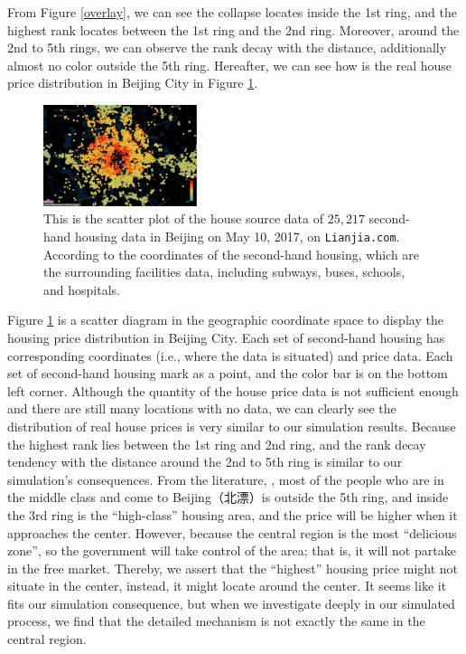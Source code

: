 \documentclass[10pt]{article}
\begin{document}
\begin{multicols}{2}
        From Figure \ref{overlay}, we can see the collapse locates inside the 1st ring, and the highest rank locates between the 1st ring and the 2nd ring. Moreover, around the 2nd to 5th rings, we can observe the rank decay with the distance, additionally almost no color outside the 5th ring. Hereafter, we can see how is the real house price distribution in Beijing City in Figure \ref{houseprice}.
        
    \begin{figure}[H]
        \centering 
        \includegraphics[width = 0.4\textwidth]{houseprice.PNG}
        \caption{This is the scatter plot of the house source data of $25,217$ second-hand housing data in Beijing on May 10, 2017, on \texttt{Lianjia.com}. According to the coordinates of the second-hand housing, which are the surrounding facilities data, including subways, buses, schools, and hospitals. \cite{price_git}}
        \label{houseprice}
    \end{figure}
    
        Figure \ref{houseprice} is a scatter diagram in the geographic coordinate space to display the housing price distribution in Beijing City. Each set of second-hand housing has corresponding coordinates (i.e., where the data is situated) and price data. Each set of second-hand housing mark as a point, and the color bar is on the bottom left corner. Although the quantity of the house price data is not sufficient enough and there are still many locations with no data, we can clearly see the distribution of real house prices is very similar to our simulation results. Because the highest rank lies between the 1st ring and 2nd ring, and the rank decay tendency with the distance around the 2nd to 5th ring is similar to our simulation's consequences. From the literature, \cite{new}, most of the people who are in the middle class and come to Beijing（北漂）is outside the 5th ring, and inside the 3rd ring is the ``high-class'' housing area, and the price will be higher when it approaches the center. However, because the central region is the most ``delicious zone'', so the government will take control of the area; that is, it will not partake in the free market. Thereby, we assert that the ``highest'' housing price might not situate in the center, instead, it might locate around the center. It seems like it fits our simulation consequence, but when we investigate deeply in our simulated process, we find that the detailed mechanism is not exactly the same in the central region.


\end{multicols}
\end{document}
